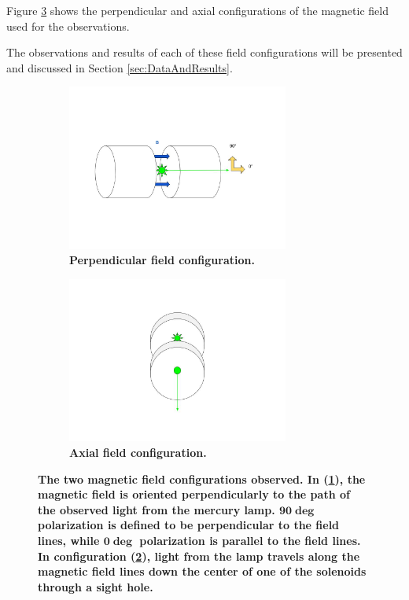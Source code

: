 \documentclass[twocolumn]{article}
\begin{document}
	Figure \ref{fig:FieldConfig} shows the perpendicular and axial configurations of the magnetic field used for the observations.
	
	The observations and results of each of these field configurations will be presented and discussed in Section \ref{sec:DataAndResults}.
	
	 
	
	
	\begin{figure}[t]
		\centering
		\begin{subfigure}{0.55\textwidth}
			\includegraphics[width = 0.8\textwidth]{Images/FieldConfigA.jpg}
			\caption{\textbf{Perpendicular field configuration.}}
			\label{subfig:PerpFieldConfig}
		\end{subfigure}%
		\begin{subfigure}{0.55\textwidth}
			\centering
			\includegraphics[width=0.8\textwidth]{Images/FieldConfigB.jpg}
			\caption{\textbf{Axial field configuration.}}
			\label{subfig:AxialFieldConfig}
		\end{subfigure}%
		\caption{\textbf{The two magnetic field configurations observed. In (\ref{subfig:PerpFieldConfig}), the magnetic field is oriented perpendicularly to the path of the observed light from the mercury lamp. $\mathbf{90\deg}$ polarization is defined to be perpendicular to the field lines, while $\mathbf{0\deg}$ polarization is parallel to the field lines. In configuration (\ref{subfig:AxialFieldConfig}), light from the lamp travels along the magnetic field lines down the center of one of the solenoids through a sight hole.}}
		\label{fig:FieldConfig}
	\end{figure}
	
\end{document}
